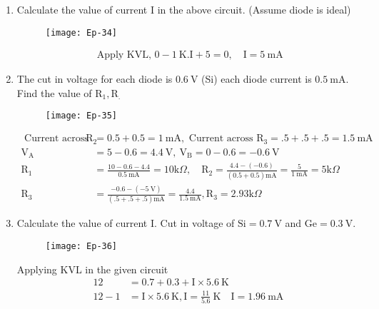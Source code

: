 \newpage
\begin{enumerate}
	\item Calculate the value of current I in the above circuit. (Assume diode is ideal)
	\begin{figure}[H]
		\centering
		\texttt{[image: Ep-34]}
	\end{figure}
	\begin{answer}
		\begin{align*}
		\text { Apply KVL, } 0-1 \mathrm{~K} . \mathrm{I}+5=0, \quad \mathrm{I}=5 \mathrm{~mA}
		\end{align*}
	\end{answer}
	\item The cut in voltage for each diode is $0.6 \mathrm{~V}$ (Si) each diode current is $0.5 \mathrm{~mA}$. Find the value of $\mathrm{R}_{1}, \mathrm{R}_{\text {. }}$
	\begin{figure}[H]
		\centering
		\texttt{[image: Ep-35]}
	\end{figure}
	\begin{answer}
		\begin{align*}
		\text { Current across } \mathrm{R}_{2}&=0.5+0.5=1 \mathrm{~mA}, \text { Current across } \mathrm{R}_{3}=.5+.5+.5=1.5 \mathrm{~mA}\\
		\mathrm{V}_{\mathrm{A}}&=5-0.6=4.4 \mathrm{~V}, \mathrm{~V}_{\mathrm{B}}=0-0.6=-0.6 \mathrm{~V}\\
		\mathrm{R}_{1}&=\frac{10-0.6-4.4}{0.5 \mathrm{~mA}}=10 \mathrm{k} \Omega, \quad \mathrm{R}_{2}=\frac{4.4-(-0.6)}{(0.5+0.5) \mathrm{mA}}=\frac{5}{1 \mathrm{~mA}}=5 \mathrm{k} \Omega\\
		\mathrm{R}_{3}&=\frac{-0.6-(-5 \mathrm{~V})}{(.5+.5+.5) \mathrm{mA}}=\frac{4.4}{1.5 \mathrm{~mA}}, \mathrm{R}_{3}=2.93 \mathrm{k} \Omega
		\end{align*}
	\end{answer}
	\item Calculate the value of current $\mathrm{I}$. Cut in voltage of $\mathrm{Si}=0.7 \mathrm{~V}$ and $\mathrm{Ge}=0.3 \mathrm{~V}$.
	\begin{figure}[H]
		\centering
		\texttt{[image: Ep-36]}
	\end{figure}
	\begin{answer}
		Applying KVL in the given circuit
		\begin{align*}
		12&=0.7+0.3+\mathrm{I} \times 5.6 \mathrm{~K}\\
		12-1&=\mathrm{I} \times 5.6 \mathrm{~K}, \mathrm{I}=\frac{11}{5.6} \mathrm{~K} \quad \mathrm{I}=1.96 \mathrm{~mA}

\end{align*}
\end{answer}
\end{enumerate}
